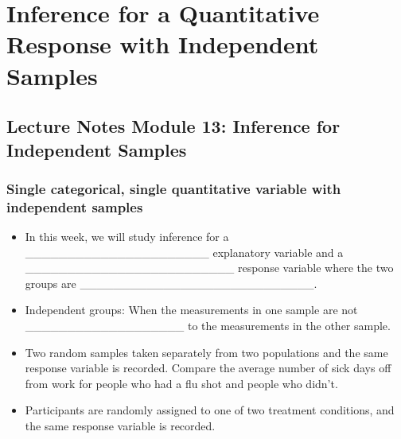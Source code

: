 \documentclass[
]{report}
\begin{document}
\newpage

\hypertarget{inference-for-a-quantitative-response-with-independent-samples}{%
\chapter{Inference for a Quantitative Response with Independent Samples}\label{inference-for-a-quantitative-response-with-independent-samples}}

\hypertarget{lecture-notes-module-13-inference-for-independent-samples}{%
\section{Lecture Notes Module 13: Inference for Independent Samples}\label{lecture-notes-module-13-inference-for-independent-samples}}


\hypertarget{single-categorical-single-quantitative-variable-with-independent-samples}{%
\subsection*{Single categorical, single quantitative variable with independent samples}\label{single-categorical-single-quantitative-variable-with-independent-samples}}


\begin{itemize}
\item
  In this week, we will study inference for a \_\_\_\_\_\_\_\_\_\_\_\_\_\_\_\_\_\_\_\_\_\_ explanatory variable and a \_\_\_\_\_\_\_\_\_\_\_\_\_\_\_\_\_\_\_\_\_\_\_\_\_ response variable where the two groups are \_\_\_\_\_\_\_\_\_\_\_\_\_\_\_\_\_\_\_\_\_\_\_\_\_\_\_\_.
\item
  Independent groups: When the measurements in one sample are not
  \_\_\_\_\_\_\_\_\_\_\_\_\_\_\_\_\_\_\_ to the measurements in the other sample.
\end{itemize}


\begin{itemize}
\item
  Two random samples taken separately from two populations and the same response variable is recorded. Compare the average number of sick days off from work for people who had a flu shot and people who didn't.
\item
  Participants are randomly assigned to one of two treatment conditions, and the same response variable is recorded.
\end{itemize}
\end{document}
